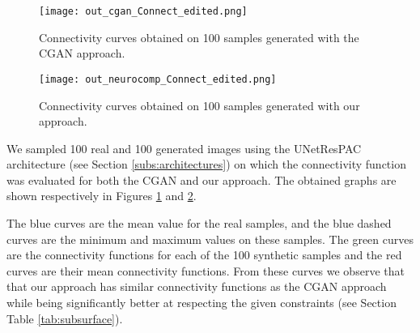\begin{figure}[t]
	\centering
	\texttt{[image: out\_cgan\_Connect\_edited.png]}
	\caption{Connectivity curves obtained on 100 samples generated with the CGAN approach.}
	\label{fig:CGAN_connectivity}
\end{figure}

\begin{figure}[!t]
	\centering
	\texttt{[image: out\_neurocomp\_Connect\_edited.png]}
	\caption{Connectivity curves obtained on 100 samples generated with our approach.}
	\label{fig:ours_connectivity}
\end{figure}



We sampled 100 real and 100 generated images using the UNetResPAC architecture (see Section \ref{subs:architectures}) on which the connectivity function was evaluated for both the CGAN and our approach. The obtained graphs are shown respectively in Figures \ref{fig:CGAN_connectivity} and \ref{fig:ours_connectivity}.

The blue curves are the mean value for the real samples, and the blue dashed curves are the minimum and maximum values on these samples. The green curves are the connectivity functions for each of the 100 synthetic samples and the red curves are their mean connectivity functions.
%
From these curves
we observe that that our approach has similar connectivity functions as the CGAN approach while being significantly better at respecting the given constraints (see Section Table \ref{tab:subsurface}). 
